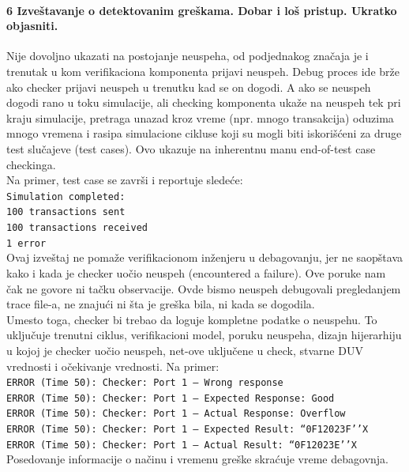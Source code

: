\documentclass[a4paper, 12pt]{article}
\begin{document}
\paragraph{6 Izveštavanje o detektovanim greškama. Dobar i loš pristup. Ukratko objasniti.}
\hfill \break
\indent Nije dovoljno ukazati na postojanje neuspeha, od podjednakog značaja je i trenutak u kom verifikaciona komponenta prijavi neuspeh. Debug proces ide brže ako checker prijavi neuspeh u trenutku kad se on dogodi. A ako se neuspeh dogodi rano u toku simulacije, ali checking komponenta ukaže na neuspeh tek pri kraju simulacije, pretraga unazad kroz vreme (npr. mnogo transakcija) oduzima mnogo vremena i rasipa simulacione cikluse koji su mogli biti iskorišćeni za druge test slučajeve (test cases). Ovo ukazuje na inherentnu manu end-of-test case checkinga.\\
\indent Na primer, test case se završi i reportuje sledeće:\\
\texttt {Simulation completed:\\
100 transactions sent\\
100 transactions received\\
1 error\\}
\indent Ovaj izveštaj ne pomaže verifikacionom inženjeru u debagovanju, jer ne saopštava kako i kada je checker uočio neuspeh (encountered a failure). Ove poruke nam čak ne govore ni tačku observacije. Ovde bismo neuspeh debugovali pregledanjem trace file-a, ne znajući ni šta je greška bila, ni kada se dogodila.\\
\indent Umesto toga, checker bi trebao da loguje kompletne podatke o neuspehu. To uključuje trenutni ciklus, verifikacioni model, poruku neuspeha, dizajn hijerarhiju u kojoj je checker uočio neuspeh, net-ove uključene u check, stvarne DUV vrednosti i očekivanje vrednosti. Na primer:\\
\texttt{ERROR (Time 50): Checker: Port 1 — Wrong response\\
ERROR (Time 50): Checker: Port 1 — Expected Response: Good\\
ERROR (Time 50): Checker: Port 1 — Actual Response: Overflow\\
ERROR (Time 50): Checker: Port 1 — Expected Result: “0F12023F’’X\\
ERROR (Time 50): Checker: Port 1 — Actual Result: “0F12023E’’X\\}
\indent Posedovanje informacije o načinu i vremenu greške skraćuje vreme debagovnja.
\end{document}

